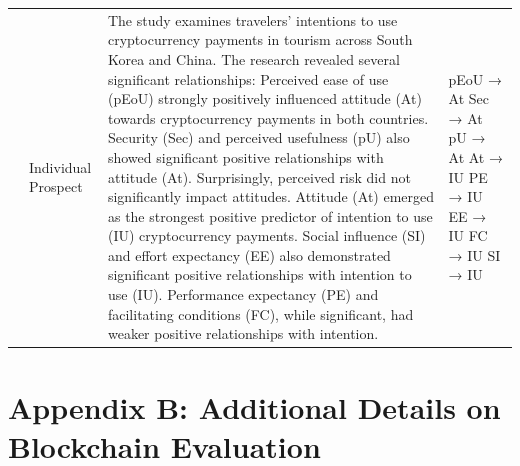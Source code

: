 \documentclass[twocolumn]{article}
\begin{document}
\begin{landscape}
\begin{longtable}{|p{1.7cm}|p{1.5cm}|p{17.7cm}|p{2.0cm}|}
\hline
\textcite{radic_you_2022} & Individual Prospect & The study examines travelers' intentions to use cryptocurrency payments in tourism across South Korea and China. The research revealed several significant relationships:
Perceived ease of use (pEoU) strongly positively influenced attitude (At) towards cryptocurrency payments in both countries. Security (Sec) and perceived usefulness (pU) also showed significant positive relationships with attitude (At). Surprisingly, perceived risk did not significantly impact attitudes.
Attitude (At) emerged as the strongest positive predictor of intention to use (IU) cryptocurrency payments. Social influence (SI) and effort expectancy (EE) also demonstrated significant positive relationships with intention to use (IU). Performance expectancy (PE) and facilitating conditions (FC), while significant, had weaker positive relationships with intention.  & pEoU → At \newline Sec → At \newline pU → At \newline At → IU \newline PE → IU \newline EE → IU \newline FC → IU \newline SI → IU \\

\end{longtable}
\end{landscape}


\clearpage
\section{Appendix B: Additional Details on Blockchain Evaluation}
\label{app2}
\end{document}

